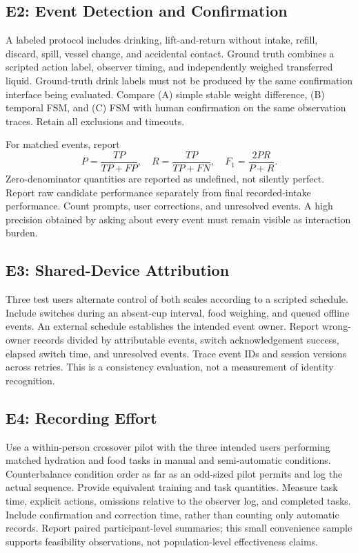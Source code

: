\subsection{E2: Event Detection and Confirmation}
A labeled protocol includes drinking, lift-and-return without intake, refill, discard, spill, vessel change, and accidental contact. Ground truth combines a scripted action label, observer timing, and independently weighed transferred liquid. Ground-truth drink labels must not be produced by the same confirmation interface being evaluated. Compare (A) simple stable weight difference, (B) temporal FSM, and (C) FSM with human confirmation on the same observation traces. Retain all exclusions and timeouts.

For matched events, report
\begin{equation}P=\frac{TP}{TP+FP},\quad R=\frac{TP}{TP+FN},\quad
F_1=\frac{2PR}{P+R}.\label{eq:detection}\end{equation}
Zero-denominator quantities are reported as undefined, not silently perfect. Report raw candidate performance separately from final recorded-intake performance. Count prompts, user corrections, and unresolved events. A high precision obtained by asking about every event must remain visible as interaction burden.

\subsection{E3: Shared-Device Attribution}
Three test users alternate control of both scales according to a scripted schedule. Include switches during an absent-cup interval, food weighing, and queued offline events. An external schedule establishes the intended event owner. Report wrong-owner records divided by attributable events, switch acknowledgement success, elapsed switch time, and unresolved events. Trace event IDs and session versions across retries. This is a consistency evaluation, not a measurement of identity recognition.

\subsection{E4: Recording Effort}
Use a within-person crossover pilot with the three intended users performing matched hydration and food tasks in manual and semi-automatic conditions. Counterbalance condition order as far as an odd-sized pilot permits and log the actual sequence. Provide equivalent training and task quantities. Measure task time, explicit actions, omissions relative to the observer log, and completed tasks. Include confirmation and correction time, rather than counting only automatic records. Report paired participant-level summaries; this small convenience sample supports feasibility observations, not population-level effectiveness claims.

